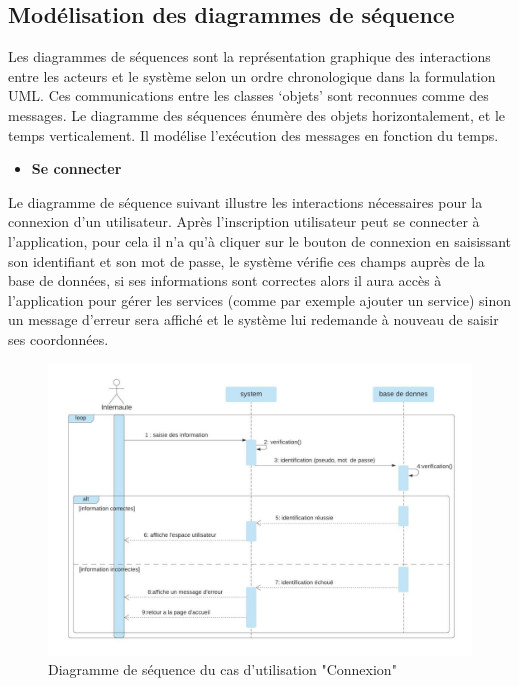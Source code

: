 \documentclass[french]{report}
\begin{document}
\subsection{Modélisation des diagrammes de séquence}

Les diagrammes de séquences sont la représentation graphique des interactions
entre les acteurs et le système selon un ordre chronologique dans la formulation
UML. Ces communications entre les classes ‘objets' sont reconnues comme des
messages. Le diagramme des séquences énumère des objets horizontalement, et le
temps verticalement. Il modélise l'exécution des messages en fonction du temps.
\cite{UML3}


\begin{itemize}
\item \textbf{Se connecter} 
\end{itemize}

Le diagramme de séquence suivant illustre les interactions nécessaires pour la
connexion d'un utilisateur. Après l'inscription utilisateur peut se connecter à
l'application, pour cela il n'a qu'à cliquer sur le bouton de connexion en
saisissant son identifiant et son mot de passe, le système vérifie ces champs
auprès de la base de données, si ses informations sont correctes alors il aura
accès à l'application pour gérer les services (comme par exemple ajouter un
service) sinon un message d'erreur sera affiché et le système lui redemande à
nouveau de saisir ses coordonnées.

\begin{figure}[H]
    \centering
    \includegraphics[width=1\textwidth]{images/sequence diag authentification.jpg}
    \caption{Diagramme de séquence du cas d'utilisation "Connexion"}
    \label{fig:my_label}
\end{figure}
\end{document}
